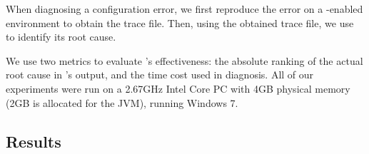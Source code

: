


When diagnosing a configuration error, we first reproduce the
error on a \ourtool-enabled environment to obtain the
trace file. Then, using the obtained trace file, we use \ourtool
to identify its root cause.

We use two metrics to evaluate \ourtool's effectiveness:
the absolute ranking of the actual root cause in \ourtool's output,
and the time cost used in diagnosis.
All of our experiments were run on a
2.67GHz Intel Core PC with 4GB physical memory (2GB is allocated
for the JVM), running Windows 7.


\subsection{Results}
\label{sec:results}

